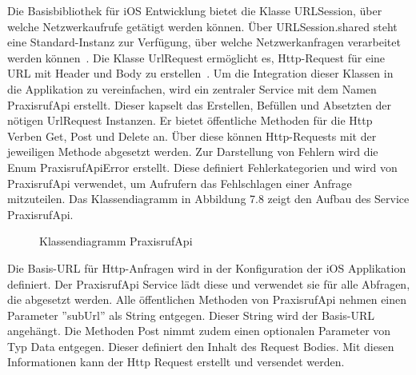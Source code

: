 Die Basisbibliothek für iOS Entwicklung bietet die Klasse URLSession, über welche Netzwerkaufrufe getätigt werden können.
Über URLSession.shared steht eine Standard-Instanz zur Verfügung, über welche Netzwerkanfragen verarbeitet werden können~\cite{ios_urlsession}.
Die Klasse UrlRequest ermöglicht es, Http-Request für eine URL mit Header und Body zu erstellen~\cite{ios_urlrequest}.
Um die Integration dieser Klassen in die Applikation zu vereinfachen, wird ein zentraler Service mit dem Namen PraxisrufApi erstellt.
Dieser kapselt das Erstellen, Befüllen und Absetzten der nötigen UrlRequest Instanzen.
Er bietet öffentliche Methoden für die Http Verben Get, Post und Delete an.
Über diese können Http-Requests mit der jeweiligen Methode abgesetzt werden.
Zur Darstellung von Fehlern wird die Enum PraxisrufApiError erstellt.
Diese definiert Fehlerkategorien und wird von PraxisrufApi verwendet, um Aufrufern das Fehlschlagen einer Anfrage mitzuteilen.
Das Klassendiagramm in Abbildung 7.8 zeigt den Aufbau des Service PraxisrufApi\@.

\begin{figure}[h]
    \centering
    \begin{minipage}[b]{0.8\textwidth}
        \caption{Klassendiagramm PraxisrufApi}
    \end{minipage}
\end{figure}

Die Basis-URL für Http-Anfragen wird in der Konfiguration der iOS Applikation definiert.
Der PraxisrufApi Service lädt diese und verwendet sie für alle Abfragen, die abgesetzt werden.
Alle öffentlichen Methoden von PraxisrufApi nehmen einen Parameter ''subUrl'' als String entgegen.
Dieser String wird der Basis-URL angehängt.
Die Methoden Post nimmt zudem einen optionalen Parameter von Typ Data entgegen.
Dieser definiert den Inhalt des Request Bodies.
Mit diesen Informationen kann der Http Request erstellt und versendet werden.

